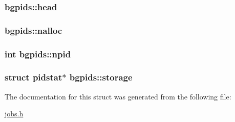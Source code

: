 \subsubsection[{\texorpdfstring{head}{head}}]{ bgpids\+::head}\hypertarget{structbgpids_adf6139c912fc1e79278110429b95aaee}{}\label{structbgpids_adf6139c912fc1e79278110429b95aaee}
\subsubsection[{\texorpdfstring{nalloc}{nalloc}}]{ bgpids\+::nalloc}\hypertarget{structbgpids_a370d36e85fac1b1cf2fdbc18b66903ae}{}\label{structbgpids_a370d36e85fac1b1cf2fdbc18b66903ae}
\subsubsection[{\texorpdfstring{npid}{npid}}]{\setlength{\rightskip}{0pt plus 5cm}int bgpids\+::npid}\hypertarget{structbgpids_a3b393c1d3d52cb76efbe24e0fffc2871}{}\label{structbgpids_a3b393c1d3d52cb76efbe24e0fffc2871}
\subsubsection[{\texorpdfstring{storage}{storage}}]{\setlength{\rightskip}{0pt plus 5cm}struct {\bf pidstat}$\ast$ bgpids\+::storage}\hypertarget{structbgpids_a9e1b9f32d9f6e5db5387b07d9e5440ff}{}\label{structbgpids_a9e1b9f32d9f6e5db5387b07d9e5440ff}


The documentation for this struct was generated from the following file\+:\begin{DoxyCompactItemize}
\item 
\hyperlink{jobs_8h}{jobs.\+h}\end{DoxyCompactItemize}
